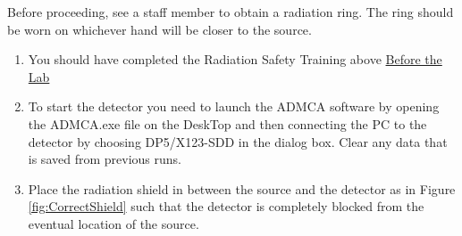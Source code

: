 \documentclass{../lab}
\begin{document}
Before proceeding, see a staff member to obtain a radiation ring. The ring should be worn on whichever hand will be closer to the source.

\begin{enumerate}
    \item You should have completed the Radiation Safety Training above \hyperref[sec:BeforeTheLab]{Before the Lab}

    \item To start the detector you need to launch the ADMCA software by opening the ADMCA.exe file on the DeskTop and then connecting the PC to the detector by choosing DP5/X123-SDD in the dialog box. Clear any data that is saved from previous runs.
    
    \item Place the radiation shield in between the source and the detector as in Figure \ref{fig:CorrectShield} such that the detector is completely blocked from the eventual location of the source. 
    

\end{enumerate}
\end{document}
